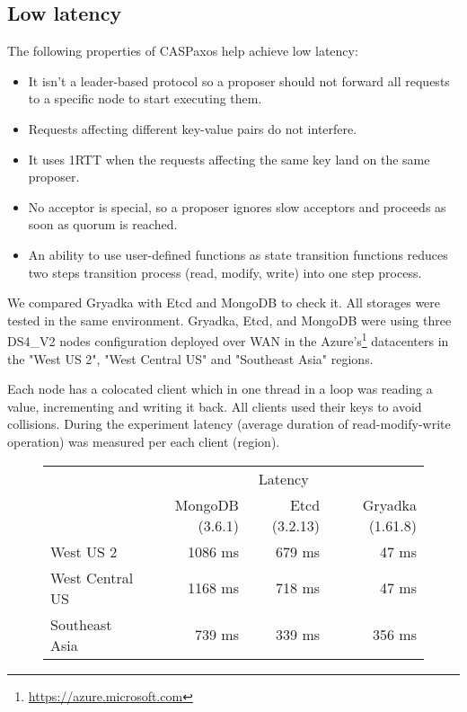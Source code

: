 \documentclass[a4paper,USenglish]{lipics-v2018}
\theoremstyle{definition}
\begin{document}
\subsection{Low latency}

    The following properties of CASPaxos help achieve low latency:

    \begin{itemize}[noitemsep]
      \item It isn't a leader-based protocol so a proposer should not forward all requests to a specific node to start executing them.

      \item Requests affecting different key-value pairs do not interfere.

      \item It uses 1RTT when the requests affecting the same key land on the same proposer.

      \item No acceptor is special, so a proposer ignores slow acceptors and proceeds as soon as quorum is reached.

      \item An ability to use user-defined functions as state transition functions reduces two steps transition process (read, modify, write) into one step process.
    \end{itemize}
    
    We compared Gryadka with Etcd and MongoDB to check it. All storages were tested in the same environment. Gryadka, Etcd, and MongoDB were using three DS4\_V2 nodes configuration deployed over WAN in the Azure's\footnote{\href{https://azure.microsoft.com}{https://azure.microsoft.com}} datacenters in the "West US 2", "West Central US" and "Southeast Asia" regions.
    
    Each node has a colocated client which in one thread in a loop was reading a value, incrementing and writing it back. All clients used their keys to avoid collisions. During the experiment latency (average duration of read-modify-write operation) was measured per each client (region).
    
    \begin{figure}[!htb]
        \centering
        \begin{tabular}{c|r|r|r|}
            \cline{2-4}
            & \multicolumn{3}{|c|}{Latency} \\
            \cline{2-4}
            & MongoDB (3.6.1) & Etcd (3.2.13) & Gryadka (1.61.8) \\
            \hline
            \multicolumn{1}{|l|}{West US 2} & 1086 ms & 679 ms & 47 ms \\
            \hline
            \multicolumn{1}{|l|}{West Central US} & 1168 ms & 718 ms & 47 ms \\
            \hline
            \multicolumn{1}{|l|}{Southeast Asia} & 739 ms & 339 ms & 356 ms \\
            \hline
        \end{tabular}
    \end{figure}
    
\end{document}
